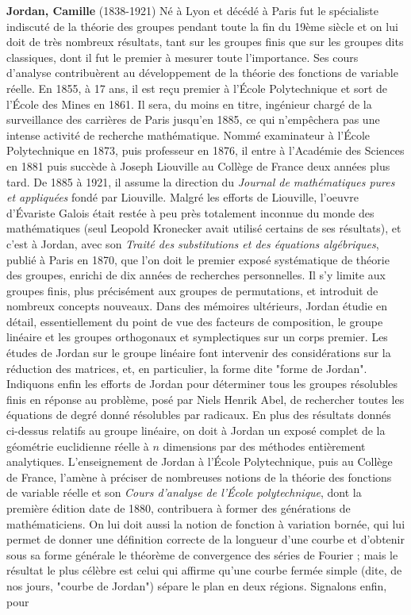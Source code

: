 \textbf{Jordan, Camille} (1838-1921) Né à Lyon et décédé à Paris fut le spécialiste indiscuté de la théorie des groupes pendant toute la fin du 19ème siècle et on lui doit de très nombreux résultats, tant sur les groupes finis que sur les groupes dits classiques, dont il fut le premier à mesurer toute l'importance. Ses cours d'analyse contribuèrent au développement de la théorie des fonctions de variable réelle. En 1855, à 17 ans, il est reçu premier à l'École Polytechnique et sort de l'École des Mines en 1861. Il sera, du moins en titre, ingénieur chargé de la surveillance des carrières de Paris jusqu'en 1885, ce qui n'empêchera pas une intense activité de recherche mathématique. Nommé examinateur à l'École Polytechnique en 1873, puis professeur en 1876, il entre à l'Académie des Sciences en 1881 puis succède à Joseph Liouville au Collège de France deux années plus tard. De 1885 à 1921, il assume la direction du \textit{Journal de mathématiques pures et appliquées} fondé par Liouville. Malgré les efforts de Liouville, l'oeuvre d'Évariste Galois était restée à peu près totalement inconnue du monde des mathématiques (seul Leopold Kronecker avait utilisé certains de ses résultats), et c'est à Jordan, avec son \textit{Traité des substitutions et des équations algébriques}, publié à Paris en 1870, que l'on doit le premier exposé systématique de théorie des groupes, enrichi de dix années de recherches personnelles. Il s'y limite aux groupes finis, plus précisément aux groupes de permutations, et introduit de nombreux concepts nouveaux. Dans des mémoires ultérieurs, Jordan étudie en détail, essentiellement du point de vue des facteurs de composition, le groupe linéaire et les groupes orthogonaux et symplectiques sur un corps premier. Les études de Jordan sur le groupe linéaire font intervenir des considérations sur la réduction des matrices, et, en particulier, la forme dite "forme de Jordan". Indiquons enfin les efforts de Jordan pour déterminer tous les groupes résolubles finis en réponse au problème, posé par Niels Henrik Abel, de rechercher toutes les équations de degré donné résolubles par radicaux. En plus des résultats donnés ci-dessus relatifs au groupe linéaire, on doit à Jordan un exposé complet de la géométrie euclidienne réelle à $n$ dimensions par des méthodes entièrement analytiques. L'enseignement de Jordan à l'École Polytechnique, puis au Collège de France, l'amène à préciser de nombreuses notions de la théorie des fonctions de variable réelle et son \textit{Cours d'analyse de l'École polytechnique}, dont la première édition date de 1880, contribuera à former des générations de mathématiciens. On lui doit aussi la notion de fonction à variation bornée, qui lui permet de donner une définition correcte de la longueur d'une courbe et d'obtenir sous sa forme générale le théorème de convergence des séries de Fourier ; mais le résultat le plus célèbre est celui qui affirme qu'une courbe fermée simple (dite, de nos jours, "courbe de Jordan") sépare le plan en deux régions. Signalons enfin, pour 